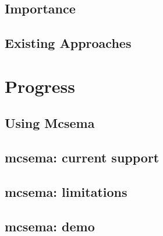 \documentclass[mathserif,10pt]{beamer}
\begin{document}
  \subsection{Importance}
  \frame
  {
    \frametitle{\subsecname}
  }

  \subsection{Existing Approaches}
  \frame
  {
    \frametitle{\subsecname}
  }

\section{Progress}
  \subsection{Using Mcsema}
  \frame
  {
    \frametitle{\subsecname}
  }

  \subsection{mcsema: current support}
  \frame
  {
    \frametitle{\subsecname}
  }

  \subsection{mcsema: limitations}
  \frame
  {
    \frametitle{\subsecname}
  }


  \subsection{mcsema: demo}
  \frame
  {
    \frametitle{\subsecname}
  }
\end{document}

